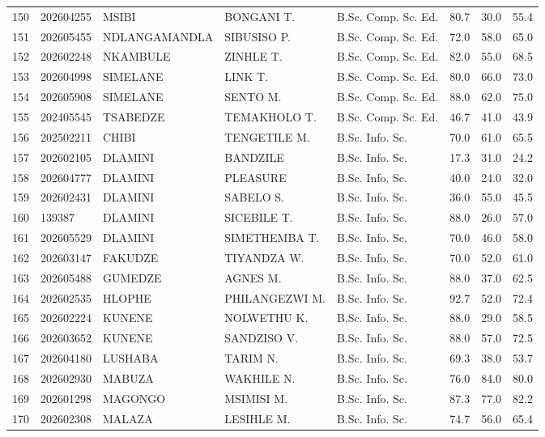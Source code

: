 \documentclass[12pt]{article}
\begin{document}
\begin{longtable}{@{}llllllll@{}}
150 & 202604255 & MSIBI & BONGANI T. & B.Sc. Comp. Sc. Ed. & 80.7 & 30.0 & 55.4 \\
151 & 202605455 & NDLANGAMANDLA & SIBUSISO P. & B.Sc. Comp. Sc. Ed. & 72.0 & 58.0 & 65.0 \\
152 & 202602248 & NKAMBULE & ZINHLE T. & B.Sc. Comp. Sc. Ed. & 82.0 & 55.0 & 68.5 \\
153 & 202604998 & SIMELANE & LINK T. & B.Sc. Comp. Sc. Ed. & 80.0 & 66.0 & 73.0 \\
154 & 202605908 & SIMELANE & SENTO M. & B.Sc. Comp. Sc. Ed. & 88.0 & 62.0 & 75.0 \\
155 & 202405545 & TSABEDZE & TEMAKHOLO T. & B.Sc. Comp. Sc. Ed. & 46.7 & 41.0 & 43.9 \\

156 & 202502211 & CHIBI & TENGETILE M. & B.Sc. Info. Sc. & 70.0 & 61.0 & 65.5 \\
157 & 202602105 & DLAMINI & BANDZILE & B.Sc. Info. Sc. & 17.3 & 31.0 & 24.2 \\
158 & 202604777 & DLAMINI & PLEASURE & B.Sc. Info. Sc. & 40.0 & 24.0 & 32.0 \\
159 & 202602431 & DLAMINI & SABELO S. & B.Sc. Info. Sc. & 36.0 & 55.0 & 45.5 \\
160 & 139387 & DLAMINI & SICEBILE T. & B.Sc. Info. Sc. & 88.0 & 26.0 & 57.0 \\
161 & 202605529 & DLAMINI & SIMETHEMBA T. & B.Sc. Info. Sc. & 70.0 & 46.0 & 58.0 \\
162 & 202603147 & FAKUDZE & TIYANDZA W. & B.Sc. Info. Sc. & 70.0 & 52.0 & 61.0 \\
163 & 202605488 & GUMEDZE & AGNES M. & B.Sc. Info. Sc. & 88.0 & 37.0 & 62.5 \\
164 & 202602535 & HLOPHE & PHILANGEZWI M. & B.Sc. Info. Sc. & 92.7 & 52.0 & 72.4 \\
165 & 202602224 & KUNENE & NOLWETHU K. & B.Sc. Info. Sc. & 88.0 & 29.0 & 58.5 \\
166 & 202603652 & KUNENE & SANDZISO V. & B.Sc. Info. Sc. & 88.0 & 57.0 & 72.5 \\
167 & 202604180 & LUSHABA & TARIM N. & B.Sc. Info. Sc. & 69.3 & 38.0 & 53.7 \\
168 & 202602930 & MABUZA & WAKHILE N. & B.Sc. Info. Sc. & 76.0 & 84.0 & 80.0 \\
169 & 202601298 & MAGONGO & MSIMISI M. & B.Sc. Info. Sc. & 87.3 & 77.0 & 82.2 \\
170 & 202602308 & MALAZA & LESIHLE M. & B.Sc. Info. Sc. & 74.7 & 56.0 & 65.4 \\

\end{longtable}
\end{document}
